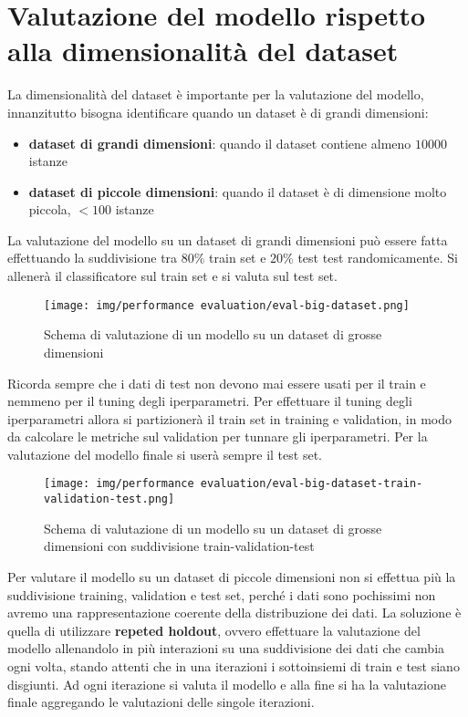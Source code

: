 \section{Valutazione del modello rispetto alla dimensionalità del dataset}
La dimensionalità del dataset è importante per la valutazione del modello, innanzitutto
bisogna identificare quando un dataset è di grandi dimensioni:
\begin{itemize}
    \item \textbf{dataset di grandi dimensioni}: quando il dataset contiene almeno
          $10000$ istanze
    \item \textbf{dataset di piccole dimensioni}: quando il dataset è di dimensione
          molto piccola, $<100$ istanze
\end{itemize}
La valutazione del modello su un dataset di grandi dimensioni può essere fatta
effettuando la suddivisione tra  $80\%$ train set e $20\%$ test test randomicamente.
Si allenerà il classificatore sul train set e si valuta sul test set.
\begin{figure}[!ht]
    \centering
    \texttt{[image: img/performance evaluation/eval-big-dataset.png]}
    \caption{Schema di valutazione di un modello su un dataset di grosse dimensioni}
    \label{fig:eval-big-dataset}
\end{figure}
Ricorda sempre che i dati di test non devono mai essere usati per il train e nemmeno
per il tuning degli iperparametri. Per effettuare il tuning degli iperparametri allora
si partizionerà il train set in training e validation, in modo da calcolare le
metriche sul validation per tunnare gli iperparametri. Per la valutazione del modello
finale si userà sempre il test set.
\begin{figure}[!ht]
    \centering
    \texttt{[image: img/performance evaluation/eval-big-dataset-train-validation-test.png]}
    \caption{Schema di valutazione di un modello su un dataset di grosse dimensioni
        con suddivisione train-validation-test}
    \label{fig:eval-big-dataset-train-validation-test}
\end{figure}
Per valutare il modello su un dataset di piccole dimensioni non si effettua più
la suddivisione training, validation e test set, perché i dati sono pochissimi non
avremo una rappresentazione coerente della distribuzione dei dati. La soluzione è
quella di utilizzare \textbf{repeted holdout}, ovvero effettuare la valutazione
del modello allenandolo in più interazioni su una suddivisione dei dati che cambia
ogni volta, stando attenti che in una iterazioni i sottoinsiemi di train e test siano
disgiunti. Ad ogni iterazione si valuta il modello e alla fine si ha la valutazione
finale aggregando le valutazioni delle singole iterazioni.

